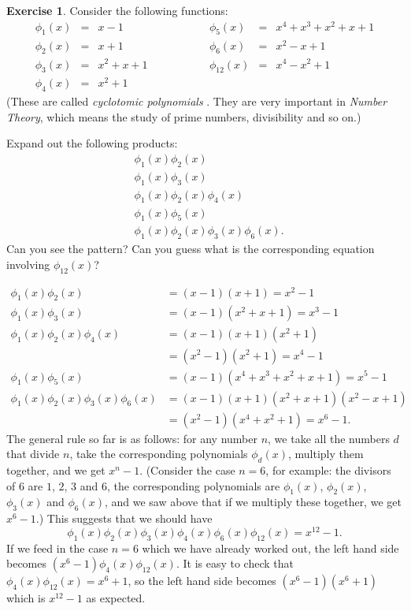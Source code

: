 \documentclass[a4paper]{book}
\newcommand{\PURPLE}[1]{{\color{purple}#1}}
\renewcommand{\:}{\colon}
\newcommand{\mathworld}[1]{}
\newcommand{\DEFN}[1]{\PURPLE{\emph{#1}}}
\theoremstyle{definition}
\newtheorem{exercise}[theorem]{Exercise}
\renewenvironment{solution}{\SolutionInline}{\endSolutionInline}
\begin{document}
\begin{exercise}
 Consider the following functions:
 \[ \begin{array}{rclcrcl}
  \phi_1(x) &=& x - 1 & \hspace{4em} &
   \phi_5(x) &=& x^4 + x^3 + x^2 + x + 1\\
  \phi_2(x) &=& x + 1 &&
   \phi_6(x) &=& x^2 - x + 1\\
  \phi_3(x) &=& x^2 + x + 1 &&
   \phi_{12}(x) &=& x^4 - x^2 + 1 \\
  \phi_4(x) &=& x^2 + 1
 \end{array} \]
 (These are called \DEFN{cyclotomic polynomials}
 \mathworld{CyclotomicPolynomial}.  They are very important in
 \DEFN{Number Theory}, which means the study of prime numbers,
 divisibility and so on.)

 Expand out the following products:
 \begin{align*}
  & \phi_1(x)\phi_2(x) \\
  & \phi_1(x)\phi_3(x) \\
  & \phi_1(x)\phi_2(x)\phi_4(x) \\
  & \phi_1(x)\phi_5(x) \\
  & \phi_1(x)\phi_2(x)\phi_3(x)\phi_6(x).
 \end{align*}
 Can you see the pattern?  Can you guess what is the corresponding
 equation involving $\phi_{12}(x)$?
\end{exercise}
\begin{solution}
 \begin{align*}
  \phi_1(x)\phi_2(x) &= (x-1)(x+1) = x^2 - 1 \\
  \phi_1(x)\phi_3(x) &= (x-1)(x^2+x+1) = x^3 - 1 \\
  \phi_1(x)\phi_2(x)\phi_4(x) &= (x-1)(x+1)(x^2+1) \\
                              &= (x^2-1)(x^2+1) = x^4 - 1 \\
  \phi_1(x)\phi_5(x) &= (x-1)(x^4+x^3+x^2+x+1) = x^5 - 1 \\
  \phi_1(x)\phi_2(x)\phi_3(x)\phi_6(x)
   &= (x-1)(x+1)(x^2+x+1)(x^2-x+1) \\
   &= (x^2-1)(x^4+x^2+1) = x^6 - 1.
 \end{align*}
 The general rule so far is as follows: for any number $n$, we take
 all the numbers $d$ that divide $n$, take the corresponding
 polynomials $\phi_d(x)$, multiply them together, and we get $x^n-1$.
 (Consider the case $n=6$, for example: the divisors of $6$ are $1$,
 $2$, $3$ and $6$, the corresponding polynomials are $\phi_1(x)$,
 $\phi_2(x)$, $\phi_3(x)$ and $\phi_6(x)$, and we saw above that if we
 multiply these together, we get $x^6-1$.)  This suggests that we
 should have
 \[ \phi_1(x)\phi_2(x)\phi_3(x)\phi_4(x)\phi_6(x)\phi_{12}(x) =
     x^{12} - 1.
 \]
 If we feed in the case $n=6$ which we have already worked out, the
 left hand side becomes $(x^6-1)\phi_4(x)\phi_{12}(x)$.  It is easy to
 check that $\phi_4(x)\phi_{12}(x)=x^6+1$, so the left hand side
 becomes $(x^6-1)(x^6+1)$ which is $x^{12}-1$ as expected.
\end{solution}
\end{document}
